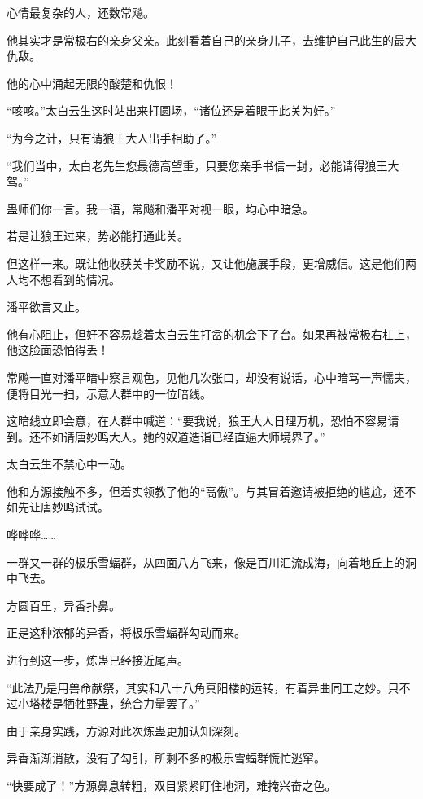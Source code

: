 \begin{this_body}
心情最复杂的人，还数常飚。

他其实才是常极右的亲身父亲。此刻看着自己的亲身儿子，去维护自己此生的最大仇敌。

他的心中涌起无限的酸楚和仇恨！

“咳咳。”太白云生这时站出来打圆场，“诸位还是着眼于此关为好。”

“为今之计，只有请狼王大人出手相助了。”

“我们当中，太白老先生您最德高望重，只要您亲手书信一封，必能请得狼王大驾。”

蛊师们你一言。我一语，常飚和潘平对视一眼，均心中暗急。

若是让狼王过来，势必能打通此关。

但这样一来。既让他收获关卡奖励不说，又让他施展手段，更增威信。这是他们两人均不想看到的情况。

潘平欲言又止。

他有心阻止，但好不容易趁着太白云生打岔的机会下了台。如果再被常极右杠上，他这脸面恐怕得丢！

常飚一直对潘平暗中察言观色，见他几次张口，却没有说话，心中暗骂一声懦夫，便将目光一扫，示意人群中的一位暗线。

这暗线立即会意，在人群中喊道：“要我说，狼王大人日理万机，恐怕不容易请到。还不如请唐妙鸣大人。她的奴道造诣已经直逼大师境界了。”

太白云生不禁心中一动。

他和方源接触不多，但着实领教了他的“高傲”。与其冒着邀请被拒绝的尴尬，还不如先让唐妙鸣试试。

哗哗哗……

一群又一群的极乐雪蝠群，从四面八方飞来，像是百川汇流成海，向着地丘上的洞中飞去。

方圆百里，异香扑鼻。

正是这种浓郁的异香，将极乐雪蝠群勾动而来。

进行到这一步，炼蛊已经接近尾声。

“此法乃是用兽命献祭，其实和八十八角真阳楼的运转，有着异曲同工之妙。只不过小塔楼是牺牲野蛊，统合力量罢了。”

由于亲身实践，方源对此次炼蛊更加认知深刻。

异香渐渐消散，没有了勾引，所剩不多的极乐雪蝠群慌忙逃窜。

“快要成了！”方源鼻息转粗，双目紧紧盯住地洞，难掩兴奋之色。

\end{this_body}

